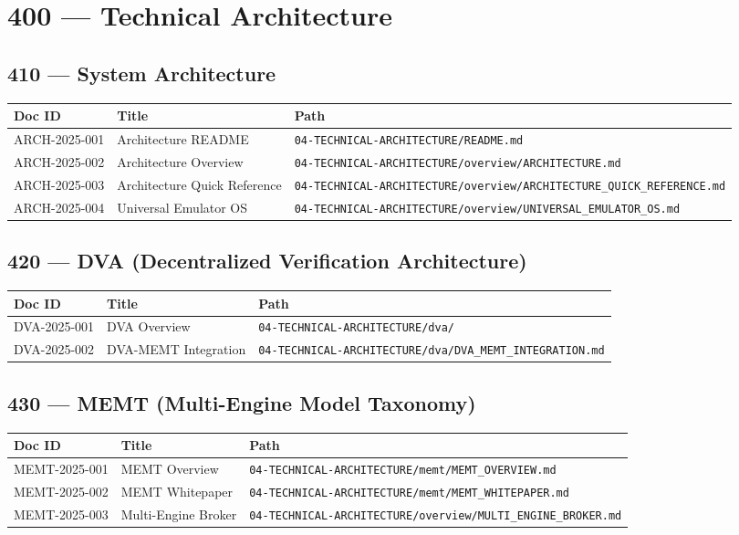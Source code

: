 \documentclass[11pt,a4paper]{article}
\begin{document}
\section{400 — Technical Architecture}

\subsection{410 — System Architecture}

\begin{longtable}{p{2cm}p{8cm}p{3cm}}
\toprule
\textbf{Doc ID} & \textbf{Title} & \textbf{Path} \\
\midrule
ARCH-2025-001 & Architecture README & \texttt{04-TECHNICAL-ARCHITECTURE/README.md} \\
ARCH-2025-002 & Architecture Overview & \texttt{04-TECHNICAL-ARCHITECTURE/overview/ARCHITECTURE.md} \\
ARCH-2025-003 & Architecture Quick Reference & \texttt{04-TECHNICAL-ARCHITECTURE/overview/ARCHITECTURE\_QUICK\_REFERENCE.md} \\
ARCH-2025-004 & Universal Emulator OS & \texttt{04-TECHNICAL-ARCHITECTURE/overview/UNIVERSAL\_EMULATOR\_OS.md} \\
\bottomrule
\end{longtable}

\subsection{420 — DVA (Decentralized Verification Architecture)}

\begin{longtable}{p{2cm}p{8cm}p{3cm}}
\toprule
\textbf{Doc ID} & \textbf{Title} & \textbf{Path} \\
\midrule
DVA-2025-001 & DVA Overview & \texttt{04-TECHNICAL-ARCHITECTURE/dva/} \\
DVA-2025-002 & DVA-MEMT Integration & \texttt{04-TECHNICAL-ARCHITECTURE/dva/DVA\_MEMT\_INTEGRATION.md} \\
\bottomrule
\end{longtable}

\subsection{430 — MEMT (Multi-Engine Model Taxonomy)}

\begin{longtable}{p{2cm}p{8cm}p{3cm}}
\toprule
\textbf{Doc ID} & \textbf{Title} & \textbf{Path} \\
\midrule
MEMT-2025-001 & MEMT Overview & \texttt{04-TECHNICAL-ARCHITECTURE/memt/MEMT\_OVERVIEW.md} \\
MEMT-2025-002 & MEMT Whitepaper & \texttt{04-TECHNICAL-ARCHITECTURE/memt/MEMT\_WHITEPAPER.md} \\
MEMT-2025-003 & Multi-Engine Broker & \texttt{04-TECHNICAL-ARCHITECTURE/overview/MULTI\_ENGINE\_BROKER.md} \\
\bottomrule
\end{longtable}
\end{document}
